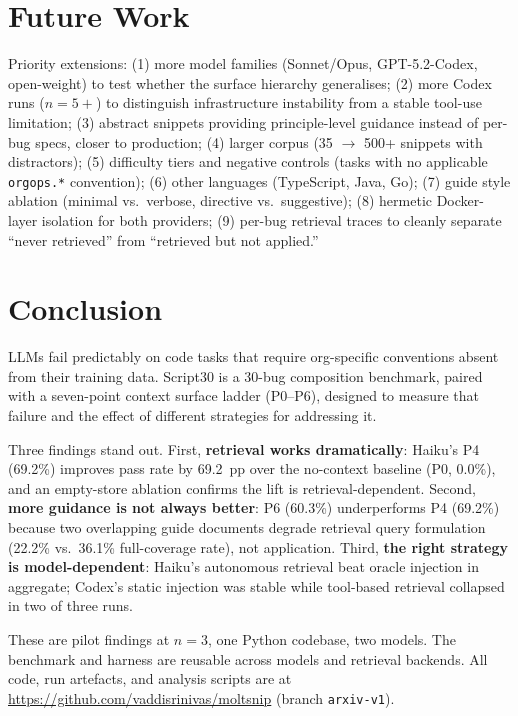\documentclass[10pt,conference]{IEEEtran}
\begin{document}
\section{Future Work}
\label{sec:future-work}

Priority extensions: (1) more model families (Sonnet/Opus, GPT-5.2-Codex, open-weight) to test whether the surface hierarchy generalises; (2) more Codex runs ($n{=}5+$) to distinguish infrastructure instability from a stable tool-use limitation; (3) abstract snippets providing principle-level guidance instead of per-bug specs, closer to production; (4) larger corpus (35 $\to$ 500+ snippets with distractors); (5) difficulty tiers and negative controls (tasks with no applicable \texttt{orgops.*} convention); (6) other languages (TypeScript, Java, Go); (7) guide style ablation (minimal vs.\ verbose, directive vs.\ suggestive); (8) hermetic Docker-layer isolation for both providers; (9) per-bug retrieval traces to cleanly separate ``never retrieved'' from ``retrieved but not applied.''

\section{Conclusion}
\label{sec:conclusion}

LLMs fail predictably on code tasks that require org-specific conventions absent from their training data.
Script30 is a 30-bug composition benchmark, paired with a seven-point context surface ladder (P0--P6), designed to measure that failure and the effect of different strategies for addressing it.

Three findings stand out.
First, \textbf{retrieval works dramatically}: Haiku's P4 (69.2\%) improves pass rate by 69.2~pp over the no-context baseline (P0, 0.0\%), and an empty-store ablation confirms the lift is retrieval-dependent.
Second, \textbf{more guidance is not always better}: P6 (60.3\%) underperforms P4 (69.2\%) because two overlapping guide documents degrade retrieval query formulation (22.2\% vs.\ 36.1\% full-coverage rate), not application.
Third, \textbf{the right strategy is model-dependent}: Haiku's autonomous retrieval beat oracle injection in aggregate; Codex's static injection was stable while tool-based retrieval collapsed in two of three runs.

These are pilot findings at $n{=}3$, one Python codebase, two models.
The benchmark and harness are reusable across models and retrieval backends.
All code, run artefacts, and analysis scripts are at \url{https://github.com/vaddisrinivas/moltsnip} (branch \texttt{arxiv-v1}).
\end{document}
